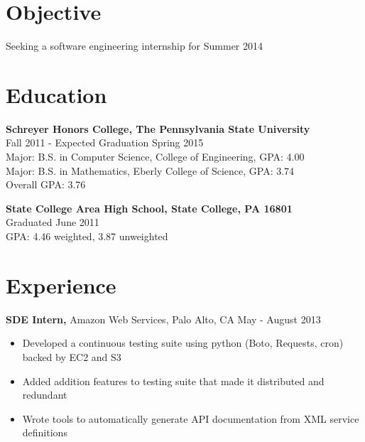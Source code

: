 \documentclass[margin]{res}
\begin{document}
 
\address{{\bf Present Address} \\ 428 West Nittany Avenue \\ Apartment 3 \\ State College, PA 16801 \\
        (814) 574-8768 }
\address{{\bf Permanent Address} \\ 3144 Williamsburg Court \\ State College, PA 16801 \\ (814) 574-0111 \\ douglasjordan0@gmail.com } 
\begin{resume} 
 
\section{Objective} 
Seeking a software engineering internship for Summer 2014

\section{Education} 
{\bf Schreyer Honors College, The Pennsylvania State University} \\
Fall 2011 - Expected Graduation Spring 2015 \\
Major: B.S. in Computer Science, College of Engineering, GPA: 4.00 \\
Major: B.S. in Mathematics, Eberly College of Science, GPA: 3.74 \\
Overall GPA: 3.76

{\bf State College Area High School, State College, PA 16801} \\
Graduated June 2011 \\
GPA: 4.46 weighted, 3.87 unweighted

\section{Experience}
{\bf SDE Intern,} Amazon Web Services, Palo Alto, CA \hfill May - August 2013
\begin{itemize} \itemsep -2pt  %
\item Developed a continuous testing suite using python (Boto, Requests, cron) backed by EC2 and S3
\item Added addition features to testing suite that made it distributed and redundant 
\item Wrote tools to automatically generate API documentation from XML service definitions
\end{itemize}


\end{resume}
\end{document}
